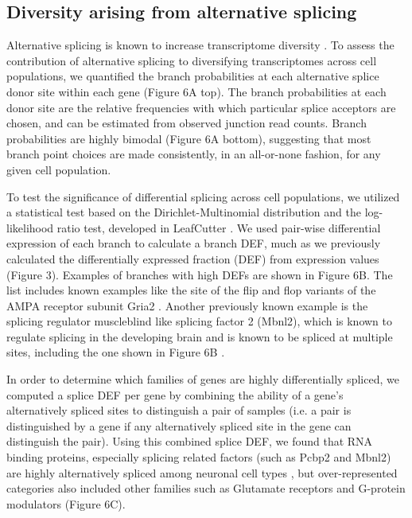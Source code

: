 \subsection{Diversity arising from alternative splicing}

Alternative splicing is known to increase transcriptome diversity \citep{Andreadis_1987}. To assess the contribution of alternative splicing to diversifying transcriptomes across cell populations, we quantified the branch probabilities at each alternative splice donor site within each gene (Figure 6A top). The branch probabilities at each donor site are the relative frequencies with which particular splice acceptors are chosen, and can be estimated from observed junction read counts. Branch probabilities are highly bimodal (Figure 6A bottom), suggesting that most branch point choices are made consistently, in an all-or-none fashion, for any given cell population.

To test the significance of differential splicing across cell populations, we utilized a statistical test based on the Dirichlet-Multinomial distribution and the log-likelihood ratio test, developed in LeafCutter \citep{Li_2016}. We used pair-wise differential expression of each branch to calculate a branch DEF, much as we previously calculated the differentially expressed fraction (DEF) from expression values (Figure 3). Examples of branches with high DEFs are shown in Figure 6B. The list includes known examples like the site of the flip and flop variants of the AMPA receptor subunit Gria2 \citep{Sommer_1990}. Another previously known example is the splicing regulator muscleblind like splicing factor 2 (Mbnl2), which is known to regulate splicing in the developing brain  \citep{Charizanis_2012} and is known to be spliced at multiple sites, including the one shown in Figure 6B \citep{Pascual_2006}. 

In order to determine which families of genes are highly differentially spliced, we computed a splice DEF per gene by combining the ability of a gene’s alternatively spliced sites to distinguish a pair of samples (i.e. a pair is distinguished by a gene if any alternatively spliced site in the gene can distinguish the pair). Using this combined splice DEF, we found that RNA binding proteins, especially splicing related factors (such as Pcbp2 and Mbnl2) are highly alternatively spliced among neuronal cell types \citep{Zheng_2013}, but over-represented categories also included other families such as Glutamate receptors and G-protein modulators (Figure 6C). 

